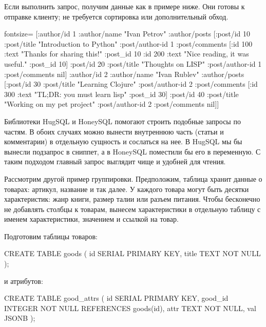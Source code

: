 Если выполнить запрос, получим данные как в примере ниже. Они готовы к отправке клиенту; не требуется сортировка или дополнительный обход.

\begin{english}
  \begin{clojure*}{fontsize=\small}
[{:author/id 1
  :author/name "Ivan Petrov"
  :author/posts
    [{:post/id 10
      :post/title "Introduction to Python"
      :post/author-id 1
      :post/comments
        [{:id 100
          :text "Thanks for sharing this!"
          :post_id 10}
         {:id 200
          :text "Nice reading, it was useful."
          :post_id 10}]}
     {:post/id 20
      :post/title "Thoughts on LISP"
      :post/author-id 1
      :post/comments nil}]}
 {:author/id 2
  :author/name "Ivan Rublev"
  :author/posts
    [{:post/id 30
      :post/title "Learning Clojure"
      :post/author-id 2
      :post/comments
        [{:id 300
          :text "TL;DR: you must learn lisp"
          :post_id 30}]}
     {:post/id 40
      :post/title "Working on my pet project"
      :post/author-id 2
      :post/comments nil}]}]
  \end{clojure*}
\end{english}

Библиотеки HugSQL и HoneySQL помогают строить подобные запросы по частям. В обоих случаях можно вынести внутреннюю часть (статьи и комментарии) в отдельную сущность и сослаться на нее. В HugSQL мы бы вынесли подзапрос в сниппет, а в HoneySQL поместили бы его в переменную. С таким подходом главный запрос выглядит чище и удобней для чтения.

Рассмотрим другой пример группировки. Предположим, таблица хранит данные о товарах: артикул, название и так далее. У каждого товара могут быть десятки характеристик: жанр книги, размер талии или разъем питания. Чтобы бесконечно не добавлять столбцы к товарам, вынесем характеристики в отдельную таблицу с именем характеристики, значением и ссылкой на товар.

Подготовим таблицы товаров:

\begin{english}
  \begin{sql}
CREATE TABLE goods (
  id SERIAL PRIMARY KEY,
  title TEXT NOT NULL
);
  \end{sql}
\end{english}

\noindent
и атрибутов:

\begin{english}
  \begin{sql}
CREATE TABLE good_attrs (
  id SERIAL PRIMARY KEY,
  good_id INTEGER NOT NULL REFERENCES goods(id),
  attr TEXT NOT NULL,
  val JSONB
);
  \end{sql}
\end{english}

